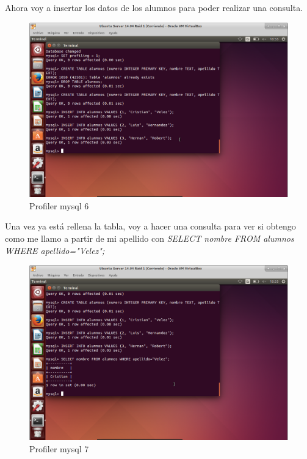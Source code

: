 Ahora voy a insertar los datos de los alumnos para poder realizar una consulta.

\begin{figure}[H] %
	\centering
	\includegraphics[scale=0.35]{pics/profile6.png}  %
	\caption{Profiler mysql 6} \label{fig:p6}
\end{figure}

Una vez ya está rellena la tabla, voy a hacer una consulta para ver si obtengo como me llamo a partir de mi apellido con \textit{SELECT nombre FROM alumnos WHERE apellido="Velez";}

\begin{figure}[H] %
	\centering
	\includegraphics[scale=0.35]{pics/profile7.png}  %
	\caption{Profiler mysql 7} \label{fig:p7}
\end{figure}

